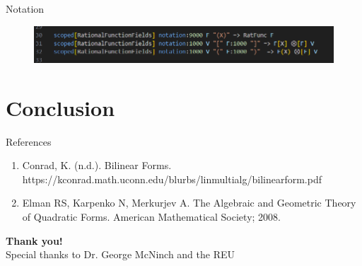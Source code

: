 \documentclass[svgnames]{beamer}
\begin{document}
\begin{frame}{Notation}
\begin{figure}
    \centering
    \includegraphics[width=1\linewidth]{image9.png}
\end{figure}
\end{frame}

\section{Conclusion}

\begin{frame}{References}
\begin{enumerate}
\item Conrad, K. (n.d.). Bilinear Forms. https://kconrad.math.uconn.edu/blurbs/linmultialg/bilinearform.pdf
\item Elman RS, Karpenko N, Merkurjev A. The Algebraic and Geometric Theory of Quadratic Forms. American Mathematical Society; 2008.

\end{enumerate}
\end{frame}


\begin{frame}
	    \begin{center}
	        \textbf{Thank you!}\\
	        
	        Special thanks to Dr. George McNinch and the REU
         \bigbreak
         \LARGE
       
	    \end{center}
\end{frame}
\end{document}
